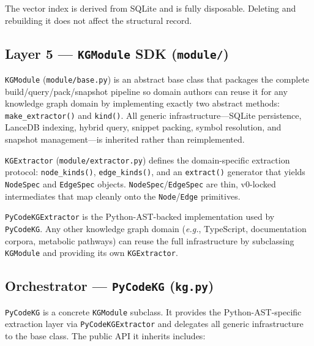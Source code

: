 \documentclass[10pt]{article}
\begin{document}
The vector index is derived from SQLite and is fully disposable. Deleting and
rebuilding it does not affect the structural record.

\subsection{Layer 5 --- \texttt{KGModule} SDK (\texttt{module/})}

\texttt{KGModule} (\texttt{module/base.py}) is an abstract base class that packages
the complete build/query/pack/snapshot pipeline so domain authors can reuse it
for any knowledge graph domain by implementing exactly two abstract methods:
\texttt{make\_extractor()} and \texttt{kind()}.  All generic infrastructure---SQLite
persistence, LanceDB indexing, hybrid query, snippet packing, symbol resolution,
and snapshot management---is inherited rather than reimplemented.

\texttt{KGExtractor} (\texttt{module/extractor.py}) defines the domain-specific
extraction protocol: \texttt{node\_kinds()}, \texttt{edge\_kinds()}, and an
\texttt{extract()} generator that yields \texttt{NodeSpec} and \texttt{EdgeSpec}
objects.  \texttt{NodeSpec}/\texttt{EdgeSpec} are thin, v0-locked intermediates that
map cleanly onto the \texttt{Node}/\texttt{Edge} primitives.

\texttt{PyCodeKGExtractor} is the Python-AST-backed implementation used by
\texttt{PyCodeKG}.  Any other knowledge graph domain (\emph{e.g.}, TypeScript,
documentation corpora, metabolic pathways) can reuse the full infrastructure by
subclassing \texttt{KGModule} and providing its own \texttt{KGExtractor}.

\subsection{Orchestrator --- \texttt{PyCodeKG} (\texttt{kg.py})}

\texttt{PyCodeKG} is a concrete \texttt{KGModule} subclass.  It provides the
Python-AST-specific extraction layer via \texttt{PyCodeKGExtractor} and delegates
all generic infrastructure to the base class.  The public API it inherits includes:
\end{document}
